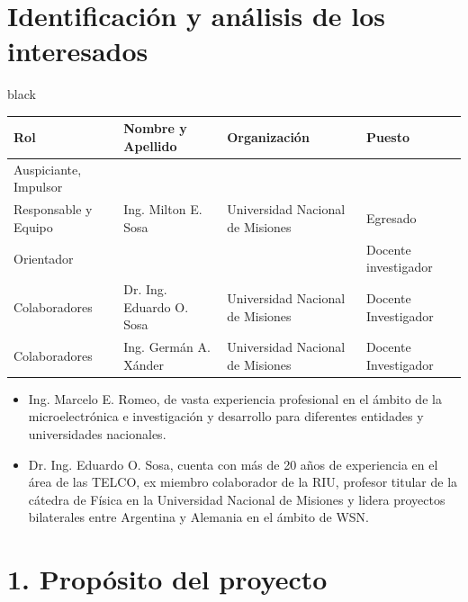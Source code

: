 \documentclass[11pt]{charter}
\begin{document}
\section{Identificación y análisis de los interesados}
\label{sec:interesados}

\begin{consigna}{black} 

\begin{table}[H]
\begin{tabularx}{\linewidth}{@{}|l|X|X|l|@{}}
\hline
\rowcolor[HTML]{C0C0C0} 
Rol           & Nombre y Apellido & Organización 	& Puesto 	\\ \hline
Auspiciante, Impulsor\\Responsable y Equipo  	    & Ing. Milton E. Sosa & Universidad Nacional de Misiones &Egresado   	\\ \hline
Orientador    & \supname	      & \pertesupname 	& Docente investigador \\ \hline
Colaboradores & Dr. Ing. Eduardo O. Sosa                  &Universidad Nacional de Misiones             	&Docente Investigador    	\\ \hline
Colaboradores & Ing. Germán A. Xánder                  &Universidad Nacional de Misiones             	&Docente Investigador    	\\ \hline

\end{tabularx}
\end{table}
 
\begin{itemize}
\item Ing. Marcelo E. Romeo, de vasta experiencia profesional en el ámbito de la microelectrónica e investigación y desarrollo para diferentes entidades y universidades nacionales.
\item Dr. Ing. Eduardo O. Sosa, cuenta con más de 20 años de experiencia en el área de las TELCO, ex miembro colaborador de la RIU, profesor titular de la cátedra de Física en la Universidad Nacional de Misiones y lidera proyectos bilaterales entre Argentina y Alemania en el ámbito de WSN.
\end{itemize}

\end{consigna}


\section{1. Propósito del proyecto}
\label{sec:proposito}
\end{document}
